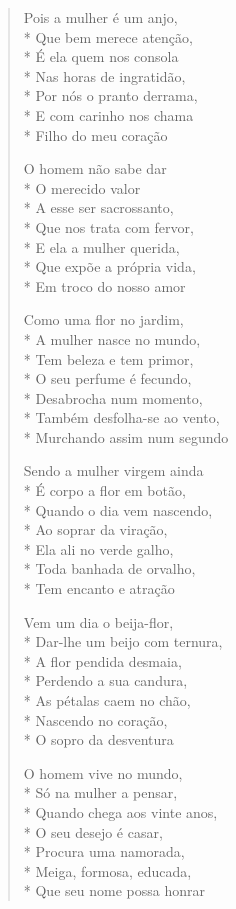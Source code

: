 \begin{verse}
Pois a mulher é um anjo,\\*
Que bem merece atenção,\\*
É ela quem nos consola\\*
Nas horas de ingratidão,\\*
Por nós o pranto derrama,\\*
E com carinho nos chama\\*
Filho do meu coração

O homem não sabe dar\\*
O merecido valor\\*
A esse ser sacrossanto,\\*
Que nos trata com fervor,\\*
E ela a mulher querida,\\*
Que expõe a própria vida,\\*
Em troco do nosso amor

Como uma flor no jardim,\\*
A mulher nasce no mundo,\\*
Tem beleza e tem primor,\\*
O seu perfume é fecundo,\\*
Desabrocha num momento,\\*
Também desfolha-se ao vento,\\*
Murchando assim num segundo

Sendo a mulher virgem ainda\\*
É corpo a flor em botão,\\*
Quando o dia vem nascendo,\\*
Ao soprar da viração,\\*
Ela ali no verde galho,\\*
Toda banhada de orvalho,\\*
Tem encanto e atração

Vem um dia o beija-flor,\\*
Dar-lhe um beijo com ternura,\\*
A flor pendida desmaia,\\*
Perdendo a sua candura,\\*
As pétalas caem no chão,\\*
Nascendo no coração,\\*
O sopro da desventura

O homem vive no mundo,\\*
Só na mulher a pensar,\\*
Quando chega aos vinte anos,\\*
O seu desejo é casar,\\*
Procura uma namorada,\\*
Meiga, formosa, educada,\\*
Que seu nome possa honrar


\end{verse}

